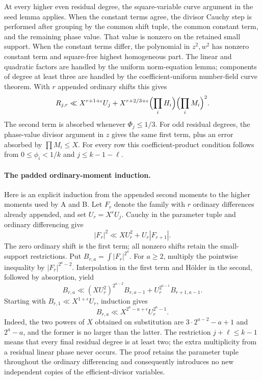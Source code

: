 \documentclass[11pt,reqno]{amsart}
\numberwithin{equation}{section}
\theoremstyle{definition}
\begin{document}
At every higher even residual degree, the square-variable curve argument
in the seed lemma applies.  When the constant terms agree, the divisor
Cauchy step is performed after grouping by the common shift tuple, the
common constant term, and the remaining phase value.  That value is
nonzero on the retained small support.  When the constant terms differ,
the polynomial in $z^2,w^2$ has nonzero constant term and square-free
highest homogeneous part.  The linear and quadratic factors are handled
by the uniform norm-equation lemma; components of degree at least three
are handled by the coefficient-uniform number-field curve theorem.
With $r$ appended ordinary shifts this gives
\[
 R_{j,r}\ll X^{r+1+\epsilon}U_j+
 X^{r+2/3+\epsilon}\Bigl(\prod_iH_i\Bigr)\Bigl(\prod_iM_i\Bigr)^2.
\]
The second term is absorbed whenever $\Phi_j\le1/3$.
For odd residual degrees, the phase-value divisor argument in $z$ gives
the same first term, plus an error absorbed by $\prod M_i\le X$.
For every row this coefficient-product condition follows from
$0\le\phi_i<1/k$ and $j\le k-1-\ell$.

\paragraph{The padded ordinary-moment induction.}
Here is an explicit induction from the appended second moments to the
higher moments used by A and B.  Let $F_r$ denote the family with $r$
ordinary differences already appended, and set $U_r=X^rU_j$.
Cauchy in the parameter tuple and ordinary differencing give
\[
                     |F_r|^2\ll XU_r^2+U_r|F_{r+1}|.
\]
The zero ordinary shift is the first term; all nonzero shifts retain the
small-support restrictions.  Put
$B_{r,a}=\int|F_r|^{2^a}$.  For $a\ge2$, multiply the pointwise inequality
by $|F_r|^{2^a-2}$.  Interpolation in the first term and H\"older in the
second, followed by absorption, yield
\[
 B_{r,a}\ll (XU_r^2)^{2^{a-2}}B_{r,a-1}
                  +U_r^{2^{a-1}}B_{r+1,a-1}.
\]
Starting with $B_{r,1}\ll X^{1+\epsilon}U_r$, induction gives
\[
                  B_{r,a}\ll X^{2^a-a+\epsilon}U_r^{2^a-1}.
\]
Indeed, the two powers of $X$ obtained on substitution are
$3\cdot2^{a-2}-a+1$ and $2^a-a$, and the former is no larger than the
latter.  The restriction $j+\ell\le k-1$ means that every final residual
degree is at least two; the extra multiplicity from a residual linear
phase never occurs.  The proof retains the parameter tuple throughout the
ordinary differencing and consequently introduces no new independent
copies of the efficient-divisor variables.
\end{document}
